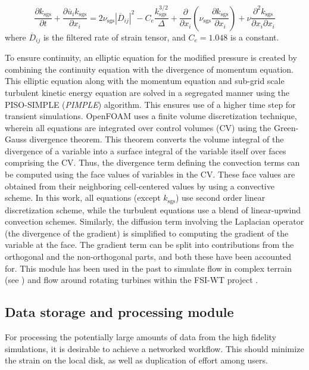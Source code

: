 \documentclass[3p,times,procedia]{elsarticle}
\begin{document}
\begin{equation}
\frac{\partial k_\text{sgs}}{\partial t}+\frac{\partial \overline{u}_{i}k_\text{sgs}}{\partial x_{i}}={}
 2\nu_\text{sgs}|\overline{D}_{ij}|^{2}-C_{e}\frac{k_\text{sgs}^{3/2}}{\Delta}
+\frac{\partial}{\partial x_{i}}\left( \nu_\text{sgs}\frac{\partial k_\text{sgs}}{\partial x_{i}}\right)+\nu\frac{\partial^{2}k_\text{sgs}}{\partial x_{i}\partial x_{i}}
\label{eqn:ksgs}
\end{equation}
where $\overline{D}_{ij}$ is the filtered rate of strain tensor, and
$C_{e}=1.048$ is a constant.

To ensure continuity, an elliptic equation for the modified pressure is created
by combining the continuity equation with the divergence of momentum equation.
This elliptic equation along with the momentum equation and sub-grid scale
turbulent kinetic energy equation are solved in a segregated manner using the
PISO-SIMPLE (\emph{PIMPLE}) algorithm. This ensures use of a higher time step
for transient simulations. OpenFOAM uses a finite volume discretization
technique, wherein all equations are integrated over control volumes (CV) using
the Green-Gauss divergence theorem. This theorem converts the volume integral of
the divergence of a variable into a surface integral of the variable itself over
faces comprising the CV. Thus, the divergence term defining the convection terms
can be computed using the face values of variables in the CV. These face values
are obtained from their neighboring cell-centered values by using a convective
scheme. In this work, all equations (except $k_\text{sgs}$) use second order
linear discretization scheme, while the turbulent equations use a blend of
linear-upwind convection schemes. Similarly, the diffusion term involving the
Laplacian operator (the divergence of the gradient) is simplified to computing
the gradient of the variable at the face. The gradient term can be split into
contributions from the orthogonal and the non-orthogonal parts, and both these
have been accounted for. This module has been used in the past to simulate flow
in complex terrain (see \cite{Tabib2016acw,Tabib2015iiw,tabib2015lrs}) and flow
around rotating turbines \cite{Siddiqui2016nan} within the FSI-WT project
\cite{Rasheed2014csm}.

\subsection{Data storage and processing module}

For processing the potentially large amounts of data from the high fidelity
simulations, it is desirable to achieve a networked workflow. This should
minimize the strain on the local disk, as well as duplication of effort among
users.
\end{document}
